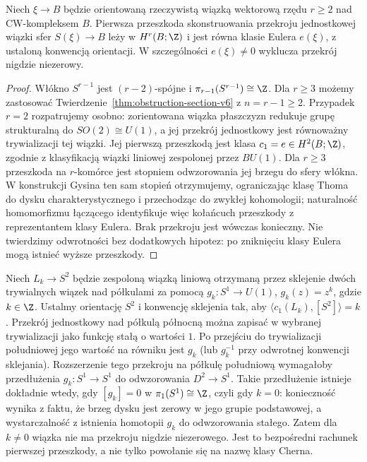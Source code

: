 \begin{wniosek}
Niech $\xi\to B$ będzie orientowaną rzeczywistą wiązką
wektorową rzędu $r\ge2$ nad CW-kompleksem $B$.
Pierwsza przeszkoda skonstruowania przekroju jednostkowej
wiązki sfer $S(\xi)\to B$ leży w $H^r(B;\Z)$ i
jest równa klasie Eulera $e(\xi)$, z ustaloną konwencją
orientacji. W szczególności $e(\xi)\ne0$ wyklucza
przekrój nigdzie niezerowy.
\end{wniosek}
\begin{proof}
Włókno $S^{r-1}$ jest $(r-2)$-spójne i
$\pi_{r-1}(S^{r-1})\cong\Z$. Dla $r\ge3$
możemy zastosować Twierdzenie~\ref{thm:obstruction-section-v6}
z $n=r-1\ge2$. Przypadek $r=2$ rozpatrujemy
osobno: zorientowana wiązka płaszczyzn redukuje
grupę strukturalną do $SO(2)\cong U(1)$,
a jej przekrój jednostkowy jest równoważny
trywializacji tej wiązki. Jej pierwszą przeszkodą
jest klasa $c_1=e\in H^2(B;\Z)$, zgodnie z klasyfikacją
wiązki liniowej zespolonej przez $BU(1)$.
Dla $r\ge3$ przeszkoda na $r$-komórce jest
stopniem odwzorowania jej brzegu do sfery włókna. W konstrukcji Gysina ten sam stopień
otrzymujemy, ograniczając klasę Thoma do dysku
charakterystycznego i przechodząc do zwykłej
kohomologii; naturalność homomorfizmu łączącego
identyfikuje więc kołańcuch przeszkody z reprezentantem
klasy Eulera. Brak przekroju jest wówczas konieczny.
Nie twierdzimy odwrotności bez dodatkowych hipotez:
po zniknięciu klasy Eulera mogą istnieć wyższe przeszkody.
\end{proof}

\begin{przyklad}
Niech $L_k\to S^2$ będzie zespoloną wiązką liniową otrzymaną
przez sklejenie dwóch trywialnych wiązek nad półkulami
za pomocą $g_k:S^1\to U(1)$, $g_k(z)=z^k$, gdzie $k\in\Z$.
Ustalmy orientację $S^2$ i konwencję sklejenia tak, aby
$\langle c_1(L_k),[S^2]\rangle=k$.
Przekrój jednostkowy nad półkulą północną można zapisać
w wybranej trywializacji jako funkcję stałą o wartości $1$.
Po przejściu do trywializacji południowej jego wartość
na równiku jest $g_k$ (lub $g_k^{-1}$ przy odwrotnej
konwencji sklejania). Rozszerzenie tego przekroju
na półkulę południową wymagałoby przedłużenia
$g_k:S^1\to S^1$ do odwzorowania $D^2\to S^1$.
Takie przedłużenie istnieje dokładnie wtedy, gdy
$[g_k]=0$ w $\pi_1(S^1)\cong\Z$, czyli gdy $k=0$:
konieczność wynika z faktu, że brzeg dysku jest
zerowy w jego grupie podstawowej, a wystarczalność
z istnienia homotopii $g_k$ do odwzorowania stałego.
Zatem dla $k\ne0$ wiązka nie ma przekroju
nigdzie niezerowego. Jest to bezpośredni rachunek
pierwszej przeszkody, a nie tylko powołanie się
na nazwę klasy Cherna.
\end{przyklad}


